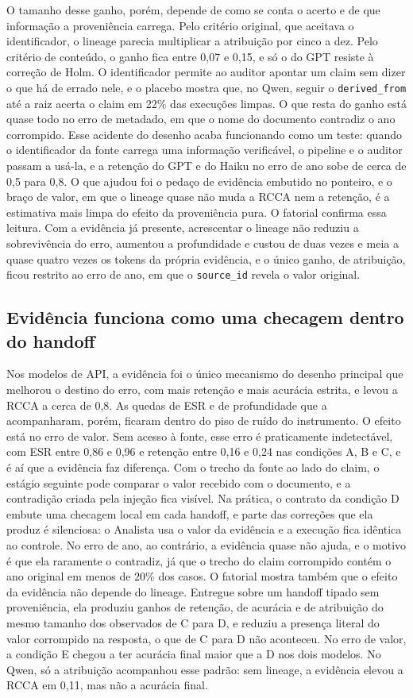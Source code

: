 O tamanho desse ganho, porém, depende de como se conta o acerto e de que informação a proveniência carrega.
Pelo critério original, que aceitava o identificador, o lineage parecia multiplicar a atribuição por cinco a dez. Pelo critério de conteúdo, o ganho fica entre 0,07 e 0,15, e só o do GPT resiste à correção de Holm.
O identificador permite ao auditor apontar um claim sem dizer o que há de errado nele, e o placebo mostra que, no Qwen, seguir o \texttt{derived\_from} até a raiz acerta o claim em 22\% das execuções limpas.
O que resta do ganho está quase todo no erro de metadado, em que o nome do documento contradiz o ano corrompido.
Esse acidente do desenho acaba funcionando como um teste: quando o identificador da fonte carrega uma informação verificável, o pipeline e o auditor passam a usá-la, e a retenção do GPT e do Haiku no erro de ano sobe de cerca de 0,5 para 0,8.
O que ajudou foi o pedaço de evidência embutido no ponteiro, e o braço de valor, em que o lineage quase não muda a RCCA nem a retenção, é a estimativa mais limpa do efeito da proveniência pura.
O fatorial confirma essa leitura. Com a evidência já presente, acrescentar o lineage não reduziu a sobrevivência do erro, aumentou a profundidade e custou de duas vezes e meia a quase quatro vezes os tokens da própria evidência, e o único ganho, de atribuição, ficou restrito ao erro de ano, em que o \texttt{source\_id} revela o valor original.

\subsection{Evidência funciona como uma checagem dentro do handoff}\label{sec:disc-evidencia}

Nos modelos de API, a evidência foi o único mecanismo do desenho principal que melhorou o destino do erro, com mais retenção e mais acurácia estrita, e levou a RCCA a cerca de 0,8.
As quedas de ESR e de profundidade que a acompanharam, porém, ficaram dentro do piso de ruído do instrumento.
O efeito está no erro de valor. Sem acesso à fonte, esse erro é praticamente indetectável, com ESR entre 0,86 e 0,96 e retenção entre 0,16 e 0,24 nas condições A, B e C, e é aí que a evidência faz diferença.
Com o trecho da fonte ao lado do claim, o estágio seguinte pode comparar o valor recebido com o documento, e a contradição criada pela injeção fica visível.
Na prática, o contrato da condição D embute uma checagem local em cada handoff, e parte das correções que ela produz é silenciosa: o Analista usa o valor da evidência e a execução fica idêntica ao controle.
No erro de ano, ao contrário, a evidência quase não ajuda, e o motivo é que ela raramente o contradiz, já que o trecho do claim corrompido contém o ano original em menos de 20\% dos casos.
O fatorial mostra também que o efeito da evidência não depende do lineage. Entregue sobre um handoff tipado sem proveniência, ela produziu ganhos de retenção, de acurácia e de atribuição do mesmo tamanho dos observados de C para D, e reduziu a presença literal do valor corrompido na resposta, o que de C para D não aconteceu. No erro de valor, a condição E chegou a ter acurácia final maior que a D nos dois modelos. No Qwen, só a atribuição acompanhou esse padrão: sem lineage, a evidência elevou a RCCA em 0,11, mas não a acurácia final.


